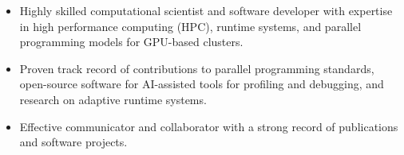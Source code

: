 
\selectfont
\begin{itemize}[itemsep=-0em]
    \item Highly skilled computational scientist and software developer with expertise in high performance computing (HPC), runtime systems, and parallel programming models for GPU-based clusters. 
    \item Proven track record of contributions to parallel programming standards, open-source software for AI-assisted tools for profiling and debugging, and research on adaptive runtime systems. 
    \item Effective communicator and collaborator with a strong record of publications and software projects. 
\end{itemize}
